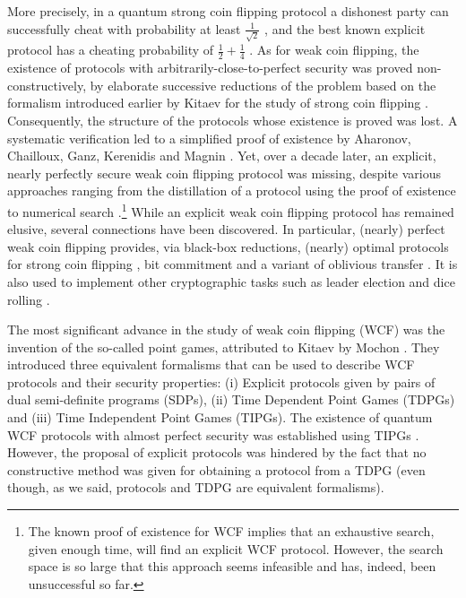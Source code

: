 \documentclass{article}
\begin{document}
More precisely, in a quantum strong coin flipping protocol a dishonest party can successfully cheat with probability at least $\frac{1}{\sqrt{2}}$ \cite{Kitaev03}, and
the best known explicit protocol %
has a cheating probability of $\frac{1}{2}+\frac{1}{4}$
\cite{Ambainis04b}. As for weak coin flipping, the existence of
protocols with arbitrarily-close-to-perfect security was
proved non-constructively, by elaborate successive reductions of the problem based on
the formalism introduced earlier by  Kitaev for the study of strong
coin flipping \cite{Kitaev03}. Consequently, the structure of the protocols whose existence
is proved was lost. A systematic verification led to a simplified proof of existence by  Aharonov, Chailloux, Ganz, Kerenidis and Magnin \cite{ACG+14}. Yet, over a decade later, an explicit, nearly perfectly secure weak coin flipping protocol was missing, despite various approaches ranging
from the distillation of a protocol using the proof of existence to
numerical search \cite{NST14,Nayak2015}.\footnote{%
  The known proof of existence for WCF implies that an exhaustive search, given enough time, will find an explicit WCF protocol. However, the search space is so large that this approach seems infeasible and has, indeed, been unsuccessful so far.}
%
While an explicit weak coin flipping protocol has remained elusive, several connections have been discovered.
In particular, (nearly) perfect weak coin flipping
provides, via black-box reductions, (nearly) optimal protocols for strong coin flipping \cite{CK09}, bit commitment \cite{CK11} and a variant of oblivious transfer \cite{Chailloux2013a}. It is also used to implement other cryptographic tasks
such as leader election \cite{Ganz2009} and dice rolling \cite{Aharon2010}.


%
The most significant advance in the study of weak coin flipping (WCF) was the invention
of the so-called point games, attributed to Kitaev  by Mochon \cite{Mochon07}.
%
They introduced three equivalent formalisms that can be used to describe
WCF protocols and their security properties: (i) Explicit protocols given by pairs of dual semi-definite programs (SDPs),
(ii) Time Dependent Point Games (TDPGs) and (iii) Time Independent Point Games
(TIPGs). The existence of quantum WCF protocols with almost perfect security was established using  TIPGs \cite{Mochon07}. However, the proposal of explicit protocols was hindered by the fact that no constructive method was given for obtaining a
protocol from a TDPG (even though, as we said, protocols and TDPG are equivalent formalisms).
\end{document}
